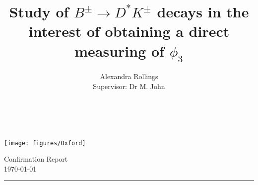 \documentclass[oneside,12pt]{article}
\title{ \LARGE \textbf{Study of $B^{\pm} \rightarrow D^{*}K^{\pm}$ decays in the
interest of obtaining a direct measuring of $\phi_3$} \\ }
\author{
		Alexandra Rollings\\	
		Supervisor: Dr M. John\\	
}
\makeatletter
\newcommand{\HRule}[1]{\rule{\linewidth}{#1}}     %
\def\printtitle{%
  {\centering \@title\par}}
\def\printauthor{%
  {\centering \large \@author}}
\makeatother
\begin{document}
\begin{titlepage}
\begin{nolinenumbers}
\thispagestyle{empty} 

\begin{minipage}[c]{.15\linewidth}
  \texttt{[image: figures/Oxford]}
\end{minipage}\hfill
\begin{minipage}[c]{.75\linewidth}
  \begin{flushright}
  \normalsize {Confirmation Report} 	%
  \\ \normalsize \today			%
  \end{flushright}
\end{minipage}



\HRule{0.5pt} \\						%
[2.0cm]
\printtitle 
\vspace{75pt}
\printauthor
\vfill
\begin{abstract}
\noindent
\\
\end{abstract}
\vfill
\end{nolinenumbers}
\end{titlepage}
\setcounter{page}{1}
\end{document}
